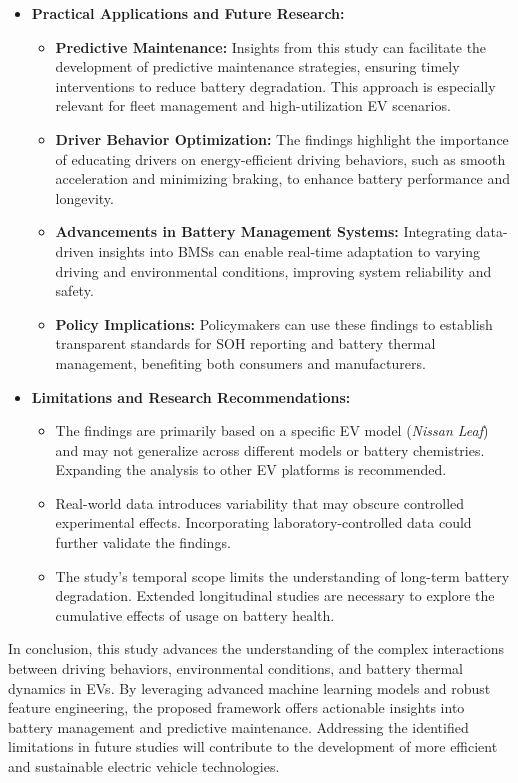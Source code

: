 \begin{itemize}
\item \textbf{Practical Applications and Future Research:}
    \begin{itemize}
        \item \textbf{Predictive Maintenance:} Insights from this study can facilitate the development of predictive maintenance strategies, ensuring timely interventions to reduce battery degradation. 
        This approach is especially relevant for fleet management and high-utilization \gls{EV} scenarios.
        \item \textbf{Driver Behavior Optimization:} The findings highlight the importance of educating drivers on energy-efficient driving behaviors, such as smooth acceleration and minimizing braking, to enhance battery performance and longevity.
        \item \textbf{Advancements in Battery Management Systems:} Integrating data-driven insights into \glspl{BMS} can enable real-time adaptation to varying driving and environmental conditions, improving system reliability and safety.
        \item \textbf{Policy Implications:} Policymakers can use these findings to establish transparent standards for \gls{SOH} reporting and battery thermal management, benefiting both consumers and manufacturers.
    \end{itemize}

\item \textbf{Limitations and Research Recommendations:}
    \begin{itemize}
        \item The findings are primarily based on a specific \gls{EV} model (\textit{Nissan Leaf}) and may not generalize across different models or battery chemistries. 
        Expanding the analysis to other \gls{EV} platforms is recommended.
        \item Real-world data introduces variability that may obscure controlled experimental effects. Incorporating laboratory-controlled data could further validate the findings.
        \item The study's temporal scope limits the understanding of long-term battery degradation. 
        Extended longitudinal studies are necessary to explore the cumulative effects of usage on battery health.
    \end{itemize}

\end{itemize}

In conclusion, this study advances the understanding of the complex interactions between driving behaviors, environmental conditions, and battery thermal dynamics in \glspl{EV}. 
By leveraging advanced machine learning models and robust feature engineering, the proposed framework offers actionable insights into battery management and predictive maintenance. 
Addressing the identified limitations in future studies will contribute to the development of more efficient and sustainable electric vehicle technologies.

\endinput